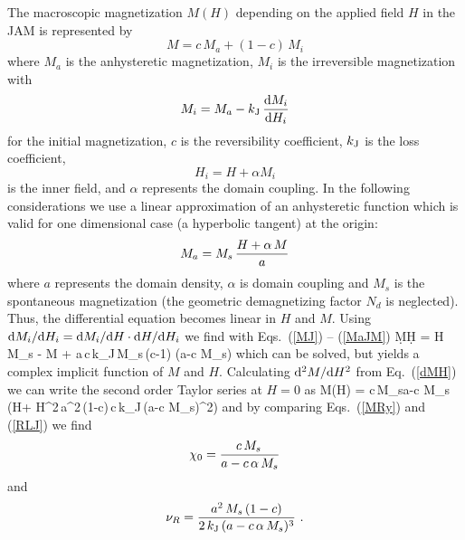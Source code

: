 \documentclass[../main.tex]{subfiles}
\begin{document}
The macroscopic magnetization $M(H)$ depending on the applied field $H$ in the JAM is represented by \cite{Jiles}
\begin{equation}
  M = c\,M_a + (1-c)\,M_i
  \label{MJ}
\end{equation}
where $M_a$ is the anhysteretic magnetization, $M_i$ is the irreversible magnetization with
\begin{equation}
  M_i = M_a - k_{\rm J}\,{{\rm d} M_i\over {\rm d} H_i}
  \label{Mi}
\end{equation}
for the initial magnetization, $c$ is the reversibility coefficient, $k_{\rm J}$ is the loss coefficient,
\begin{equation}
  H_i = H + \alpha M_i
\end{equation}
is the inner field, and $\alpha$ represents the domain coupling. In the following considerations we use a linear approximation of an anhysteretic function which is valid for one dimensional case (a hyperbolic tangent) at the origin:
\begin{equation}
  M_a = M_s\,{H+\alpha\,M\over a}
  \label{MaJM}
\end{equation}
where $a$ represents the domain density, $\alpha$ is domain coupling
and $M_s$ is the spontaneous
magnetization (the geometric demagnetizing factor $N_d$ is neglected). Thus, the
differential equation becomes linear in $H$ and $M$. Using ${\rm d} M_i/{\rm d} H_i={\rm d}
M_i/{\rm d} H\cdot {\rm d} H/{\rm d} H_i$ we find with Eqs.~(\ref{MJ}) -- (\ref{MaJM})
\be
{\d M\over \d H} = {H\,M_s -
                    M +
                    a\,c\,k_{\rm J}\,M_s\,(c-1)\over
                    (a-c\,\alpha\,M_s)}
\label{dMH}
\ee
which can be solved, but yields a complex implicit function of $M$ and $H$. Calculating ${\rm d}^2 M/{\rm d} H^2$ from Eq.~(\ref{dMH}) we can write the second order Taylor series at $H=0$ as
\be
M(H) =  {c\,M_s\over a-c\,\alpha\,M_s} \left(H+
        H^2\,{a^2\,(1-c)\,c\,k_{\rm J}\,(a-c\,\alpha\,M_s)^2}\right)
  \label{RLJ}
\ee
and by comparing Eqs.~(\ref{MRy}) and (\ref{RLJ}) we find
\begin{equation}
  \chi_0 = {c\,M_s\,\over a-c\,\alpha\,M_s}
    \label{X0J}
\end{equation}
and
\begin{equation}
  \nu_R = {a^2\,M_s\,(1-c)\over 2\,k_{\rm J}\,(a-c\,\alpha\,M_s)^3} \ .
    \label{nuJ}
\end{equation}
\end{document}
